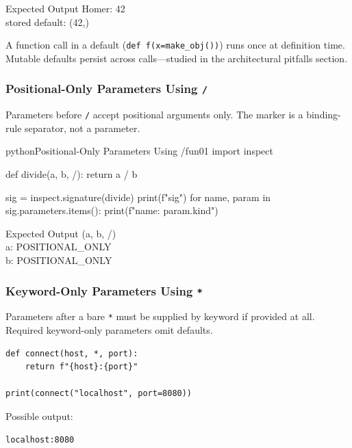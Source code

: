 \documentclass[a4paper,twoside]{report}
\begin{document}
\begin{iobox}{Expected Output}
Homer: 42 \\
stored default: (42,) \\
\end{iobox}




A function call in a default (\texttt{def f(x=make\_obj())}) runs once at definition time. Mutable defaults persist across calls---studied in the architectural pitfalls section.

\subsubsection{Positional-Only Parameters Using \texttt{/}}

Parameters before \texttt{/} accept positional arguments only. The marker is a binding-rule separator, not a parameter.

\begin{codebox}[]{python}{Positional-Only Parameters Using /}{fun01}
import inspect

def divide(a, b, /):
    return a / b

sig = inspect.signature(divide)
print(f"{sig}")
for name, param in sig.parameters.items():
    print(f"{name}: {param.kind}")
\end{codebox}


\begin{iobox}{Expected Output}
(a, b, /) \\
a: POSITIONAL\_ONLY \\
b: POSITIONAL\_ONLY \\
\end{iobox}




\subsubsection{Keyword-Only Parameters Using \texttt{*}}

Parameters after a bare \texttt{*} must be supplied by keyword if provided at all. Required keyword-only parameters omit defaults.

\begin{verbatim}
def connect(host, *, port):
    return f"{host}:{port}"

print(connect("localhost", port=8080))
\end{verbatim}

Possible output:

\begin{verbatim}
localhost:8080
\end{verbatim}
\end{document}
